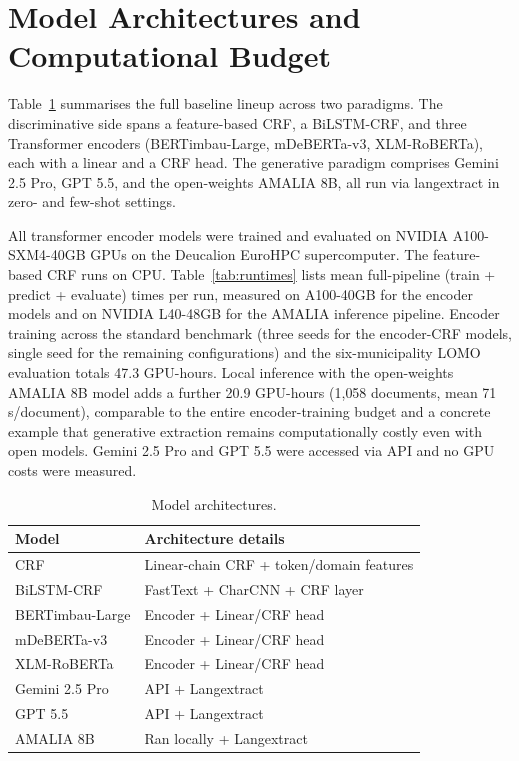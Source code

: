\documentclass[11pt]{article}
\begin{document}
\section{Model Architectures and Computational Budget}
\label{app:computational_budget}

Table~\ref{tab:model_details} summarises the full baseline lineup across two paradigms. The discriminative side spans a feature-based CRF, a BiLSTM-CRF, and three Transformer encoders (BERTimbau-Large, mDeBERTa-v3, XLM-RoBERTa), each with a
linear and a CRF head. The generative paradigm comprises Gemini 2.5 Pro, GPT 5.5, and the open-weights AMALIA 8B, all run via langextract in zero- and few-shot settings.

All transformer encoder models were trained and evaluated on NVIDIA A100-SXM4-40GB GPUs on the Deucalion EuroHPC supercomputer. The feature-based CRF runs on CPU.  Table~\ref{tab:runtimes} lists mean full-pipeline (train + predict + evaluate) times per run, measured on A100-40GB for the encoder models and on NVIDIA L40-48GB for the AMALIA inference pipeline. Encoder training across the standard benchmark (three seeds for the encoder-CRF models, single seed for the remaining configurations) and the six-municipality LOMO evaluation totals 47.3 GPU-hours. Local inference with the open-weights AMALIA 8B model adds a further 20.9 GPU-hours (1{,}058 documents, mean 71\,s/document), comparable to the entire encoder-training budget and a concrete example that generative extraction remains computationally costly even with open models. Gemini 2.5 Pro and GPT 5.5 were accessed via API and no GPU costs were measured.

\begin{table}[ht!]
\caption{Model architectures.}
\label{tab:model_details}
\centering
\small
\setlength{\tabcolsep}{3pt} %
\begin{tabularx}{\columnwidth}{l >{\raggedright\arraybackslash}X}
\toprule
\textbf{Model} & \textbf{Architecture details} \\
\midrule
CRF & Linear-chain CRF + token/domain features \cite{Lafferty2001} \\
BiLSTM-CRF & FastText + CharCNN + CRF layer \cite{huang2015bidirectionallstmcrf} \\
BERTimbau-Large & Encoder + Linear/CRF head \cite{souza2020bertimbau} \\
mDeBERTa-v3 & Encoder + Linear/CRF head \cite{2021debertav3} \\
XLM-RoBERTa & Encoder + Linear/CRF head \cite{2019XLM-Roberta} \\
\midrule
Gemini 2.5 Pro & API + Langextract \cite{gemini25} \\
GPT 5.5 \cite{openai_gpt55} & API + Langextract\\
AMALIA 8B & Ran locally + Langextract \cite{simplicio-etal-2026-amalia} \\
\bottomrule
\end{tabularx}
\end{table}
\end{document}
